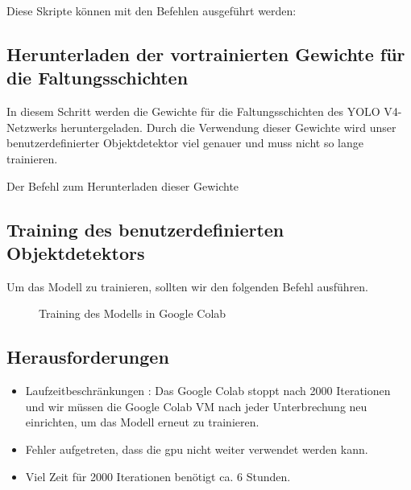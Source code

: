 Diese Skripte können mit den Befehlen ausgeführt werden:

\medskip




\subsection{Herunterladen der vortrainierten Gewichte für die Faltungsschichten}

In diesem Schritt werden die Gewichte für die Faltungsschichten des YOLO V4-Netzwerks heruntergeladen. Durch die Verwendung dieser Gewichte wird unser benutzerdefinierter Objektdetektor viel genauer und muss nicht so lange trainieren.

Der Befehl zum Herunterladen dieser Gewichte \cite{Bochkovskiy:2020}

\medskip


\subsection{Training des benutzerdefinierten Objektdetektors}

Um das Modell zu trainieren, sollten wir den folgenden Befehl ausführen.

\medskip


\medskip

\begin{figure}[H]
	\centering
	\caption{Training des Modells in Google Colab}
\end{figure}

\subsection{Herausforderungen}

\begin{itemize}
  \item Laufzeitbeschränkungen : Das Google Colab stoppt nach 2000 Iterationen und wir müssen die Google Colab VM nach jeder Unterbrechung neu einrichten, um das Modell erneut zu trainieren.
  \item Fehler aufgetreten, dass die \ac{gpu} nicht weiter verwendet werden kann.
  \item Viel Zeit für 2000 Iterationen benötigt ca. 6 Stunden.
\end{itemize}

